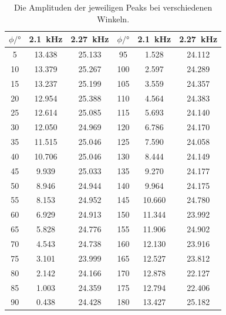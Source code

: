 \begin{table}\caption{Die Amplituden der jeweiligen Peaks bei verschiedenen Winkeln.}
    \label{tab:winkel2}
    \centering
     \begin{tabular}{S[round-precision=1] S[] S[] | S[round-precision=1] S[] S[]} 
    \toprule
{$\phi / \si{\degree}$} & {\SI{2.1}{\kilo\hertz}} & {\SI{2.27}{\kilo\hertz}} & {$\phi / \si{\degree}$} & {\SI{2.1}{\kilo\hertz}} & {\SI{2.27}{\kilo\hertz}} \\
\midrule
  
5 & 13.438 & 25.133 &      95    & 1.528 & 24.112  \\
10     & 13.379 & 25.267&  100    & 2.597 & 24.289  \\
15    & 13.237 & 25.199 &  105 & 3.559 & 24.357 \\
20   & 12.954 & 25.388 &   110  & 4.564 & 24.383 \\
25   & 12.614 & 25.085 &   115  & 5.693 & 24.140 \\
30   & 12.050 & 24.969 &   120  & 6.786 & 24.170 \\
35   & 11.515 & 25.046 &   125  & 7.590 & 24.058 \\
40   & 10.706 & 25.046 &   130  & 8.444 & 24.149 \\
45   & 9.939 & 25.033 &    135  & 9.270 & 24.177 \\
50  & 8.946 & 24.944  &    140  & 9.964 & 24.175  \\
55  & 8.153 & 24.952  &    145  & 10.660 & 24.780  \\
60  & 6.929 & 24.913  &    150  & 11.344 & 23.992  \\
65  & 5.828 & 24.776  &    155  & 11.906 & 24.902  \\
70  & 4.543 & 24.738  &    160  & 12.130 & 23.916  \\
75  & 3.101 & 23.999  &    165  & 12.527 & 23.812  \\
80  & 2.142 & 24.166  &    170  & 12.878 & 22.127  \\
85  & 1.003 & 24.359  &    175  & 12.794 & 22.406  \\
90  & 0.438 & 24.428  &    180  & 13.427 & 25.182  \\
\bottomrule
\end{tabular}\end{table}



